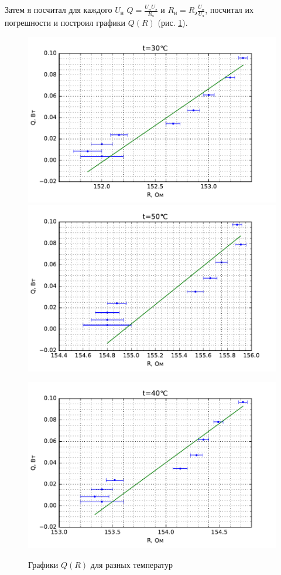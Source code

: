 \documentclass[12pt]{article}
\newcommand{\fref}[1]{рис. \ref{#1}}
\begin{document}
	Затем я посчитал для каждого $U_\text{н}$ $Q=\frac{U_\text{н} U_\text{э}}{R_\text{э}}$ и $R_\text{н}=R_\text{э} \frac{U_\text{н}}{U_\text{э}}$, посчитал их погрешности и построил графики $Q(R)$ (\fref{fig:graph_QR}).
	
	\begin{figure}[!h]
		\caption{Графики $Q(R)$ для разных температур}
		\label{fig:graph_QR}
		\begin{minipage}{0.5\linewidth}
			\includegraphics[scale=.6]{graph-QR0.pdf} \\
			\includegraphics[scale=.6]{graph-QR2.pdf}
		\end{minipage}
		\begin{minipage}{0.5\linewidth}
			\includegraphics[scale=.6]{graph-QR1.pdf} \\

\end{minipage}
\end{figure}
\end{document}
